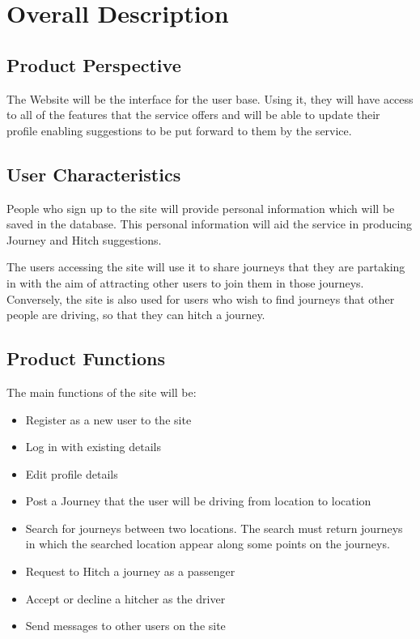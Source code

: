 \documentclass[11pt]{article}
\begin{document}
\section{Overall Description}
\subsection{Product Perspective}
The Website will be the interface for the user base. Using it, they will have access to all of the features that the service offers and will be able to update their profile enabling suggestions to be put forward to them by the service.

\subsection{User Characteristics}
People who sign up to the site will provide personal information which will be saved in the database. This personal information will aid the service in producing Journey and Hitch suggestions. 

The users accessing the site will use it to share journeys that they are partaking in with the aim of attracting other users to join them in those journeys. Conversely, the site is also used for users who wish to find journeys that other people are driving, so that they can hitch a journey.

\subsection{Product Functions}
The main functions of the site will be:
\begin{itemize}
\item Register as a new user to the site
\item Log in with existing details
\item Edit profile details
\item Post a Journey that the user will be driving from location to location
\item Search for journeys between two locations. The search must return journeys in which the searched location appear along some points on the journeys.
\item Request to Hitch a journey as a passenger
\item Accept or decline a hitcher as the driver
\item Send messages to other users on the site
\end{itemize}
\end{document}
